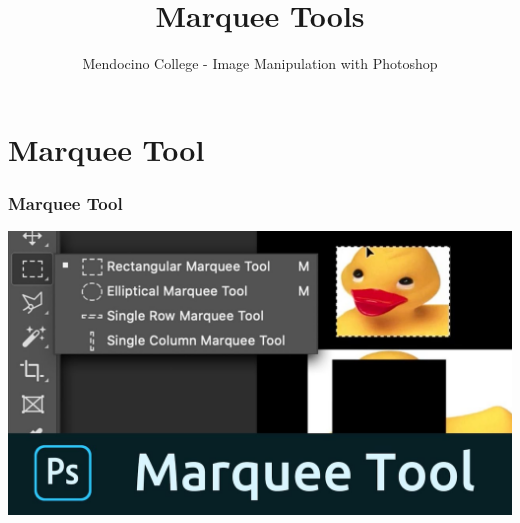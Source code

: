\documentclass{beamer}
\title{Marquee Tools}
\author{Mendocino College - Image Manipulation with Photoshop}
\date{\vspace{-5em}}
\begin{document}
	{
		\begin{frame}
			\vspace{-35pt}
			\maketitle
		\end{frame}
	}

	\section{Marquee Tool}
		\begin{frame}
		\frametitle{Marquee Tool}
		\begin{center}
			\includegraphics[width = 1.0\textwidth]{images/maxresdefault (3).jpg}
		\end{center}
	\end{frame}
	
\end{document}
